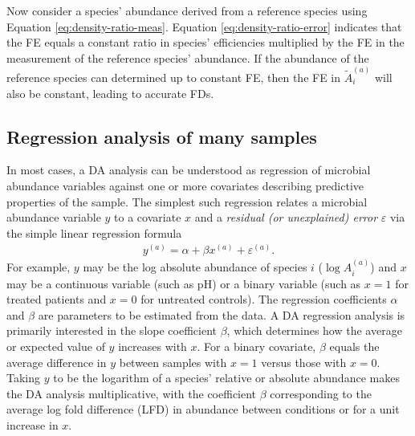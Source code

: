 \documentclass[
]{article}
\begin{document}
Now consider a species' abundance derived from a reference species using Equation \eqref{eq:density-ratio-meas}.
Equation \eqref{eq:density-ratio-error} indicates that the FE equals a constant ratio in species' efficiencies multiplied by the FE in the measurement of the reference species' abundance.
If the abundance of the reference species can determined up to constant FE, then the FE in \(\tilde A_i^{(a)}\) will also be constant, leading to accurate FDs.

\hypertarget{regression-analysis-of-many-samples}{%
\subsection{Regression analysis of many samples}\label{regression-analysis-of-many-samples}}

In most cases, a DA analysis can be understood as regression of microbial abundance variables against one or more covariates describing predictive properties of the sample.
The simplest such regression relates a microbial abundance variable \(y\) to a covariate \(x\) and a \emph{residual (or unexplained) error} \(\varepsilon\) via the simple linear regression formula
\begin{align}
  \label{eq:regression}
  y^{(a)} = \alpha + \beta x^{(a)} + \varepsilon^{(a)}.
\end{align}
For example, \(y\) may be the log absolute abundance of species \(i\) (\(\log A_i^{(a)}\)) and \(x\) may be a continuous variable (such as pH) or a binary variable (such as \(x=1\) for treated patients and \(x=0\) for untreated controls).
The regression coefficients \(\alpha\) and \(\beta\) are parameters to be estimated from the data.
A DA regression analysis is primarily interested in the slope coefficient \(\beta\), which determines how the average or expected value of \(y\) increases with \(x\).
For a binary covariate, \(\beta\) equals the average difference in \(y\) between samples with \(x=1\) versus those with \(x=0\).
Taking \(y\) to be the logarithm of a species' relative or absolute abundance makes the DA analysis multiplicative, with the coefficient \(\beta\) corresponding to the average log fold difference (LFD) in abundance between conditions or for a unit increase in \(x\).
\end{document}
